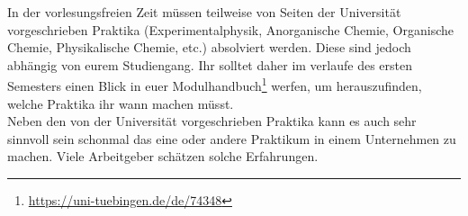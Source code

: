 In der vorlesungsfreien Zeit müssen teilweise von Seiten der Universität vorgeschrieben Praktika (Experimentalphysik, Anorganische Chemie, Organische Chemie, Physikalische Chemie, etc.) absolviert werden. Diese sind jedoch abhängig von eurem Studiengang. Ihr solltet daher im verlaufe des ersten Semesters einen Blick in euer Modulhandbuch\footnote{\url{https://uni-tuebingen.de/de/74348}} werfen, um herauszufinden, welche Praktika ihr wann machen müsst.\\

Neben den von der Universität vorgeschrieben Praktika kann es auch sehr sinnvoll sein schonmal das eine oder andere Praktikum in einem Unternehmen zu machen. Viele Arbeitgeber schätzen solche Erfahrungen.

\vfill